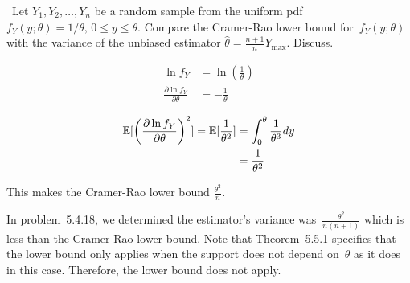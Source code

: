 \begin{problem}
  ~Let ${Y_1,Y_2,\ldots,Y_n}$ be a random sample from the uniform pdf ${f_Y(y;\theta) = 1 / \theta \text{, } 0 \leq y \leq \theta}$. Compare the Cramer-Rao lower bound for~${f_Y(y;\theta)}$ with the variance of the unbiased estimator ${\hat{\theta} = \frac{n+1}{n} Y_{\max}}$. Discuss.
\end{problem}

\begin{align}
  \ln f_Y &= \ln \left(\frac{1}{\theta}\right) \\
  \frac{\partial \ln f_Y}{\partial \theta} &= -\frac{1}{\theta} %
\end{align}

\begin{align}
  \mathbb{E}\lbrack\left(\frac{\partial \ln f_Y}{\partial \theta} \right)^2\rbrack = \mathbb{E}\lbrack\frac{1}{\theta^2}\rbrack &= \int_{0}^{\theta}\frac{1}{\theta^3}dy \\
                              &= \frac{1}{\theta^2}
\end{align}

This makes the Cramer-Rao lower bound $\boxed{\frac{\theta^2}{n}}$.

In problem~5.4.18, we determined the estimator's variance was~$\frac{\theta^2}{n(n+1)}$ which is less than the Cramer-Rao lower bound.  Note that Theorem~5.5.1 specifics that the lower bound only applies when the support does not depend on~$\theta$ as it does in this case.  Therefore, the lower bound does not apply.
